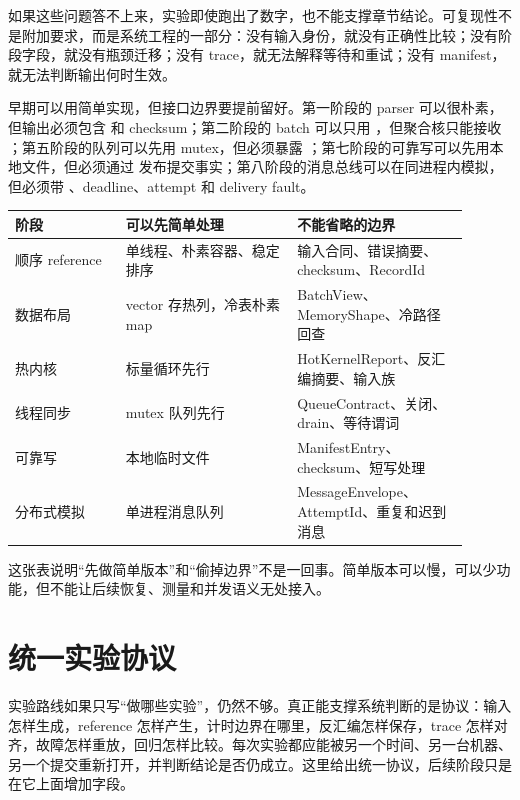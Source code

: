 如果这些问题答不上来，实验即使跑出了数字，也不能支撑章节结论。可复现性不是附加要求，而是系统工程的一部分：没有输入身份，就没有正确性比较；没有阶段字段，就没有瓶颈迁移；没有 trace，就无法解释等待和重试；没有 manifest，就无法判断输出何时生效。

早期可以用简单实现，但接口边界要提前留好。第一阶段的 parser 可以很朴素，但输出必须包含  和 checksum；第二阶段的 batch 可以只用 ，但聚合核只能接收 ；第五阶段的队列可以先用 mutex，但必须暴露 ；第七阶段的可靠写可以先用本地文件，但必须通过  发布提交事实；第八阶段的消息总线可以在同进程内模拟，但必须带 、deadline、attempt 和 delivery fault。

\begin{center}
\small
\begin{tabular}{@{}p{0.22\linewidth}p{0.34\linewidth}p{0.34\linewidth}@{}}
\toprule
阶段 & 可以先简单处理 & 不能省略的边界 \\
\midrule
顺序 reference & 单线程、朴素容器、稳定排序 & 输入合同、错误摘要、checksum、RecordId \\
数据布局 & vector 存热列，冷表朴素 map & BatchView、MemoryShape、冷路径回查 \\
热内核 & 标量循环先行 & HotKernelReport、反汇编摘要、输入族 \\
线程同步 & mutex 队列先行 & QueueContract、关闭、drain、等待谓词 \\
可靠写 & 本地临时文件 & ManifestEntry、checksum、短写处理 \\
分布式模拟 & 单进程消息队列 & MessageEnvelope、AttemptId、重复和迟到消息 \\
\bottomrule
\end{tabular}
\end{center}

这张表说明“先做简单版本”和“偷掉边界”不是一回事。简单版本可以慢，可以少功能，但不能让后续恢复、测量和并发语义无处接入。

\section{统一实验协议}

实验路线如果只写“做哪些实验”，仍然不够。真正能支撑系统判断的是协议：输入怎样生成，reference 怎样产生，计时边界在哪里，反汇编怎样保存，trace 怎样对齐，故障怎样重放，回归怎样比较。每次实验都应能被另一个时间、另一台机器、另一个提交重新打开，并判断结论是否仍成立。这里给出统一协议，后续阶段只是在它上面增加字段。

